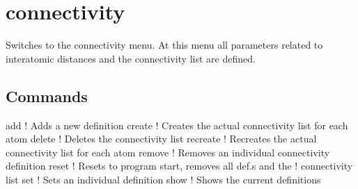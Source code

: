 \section{connectivity}
\par
Switches to the connectivity menu. 
At this menu all parameters related to interatomic distances 
and the connectivity list are defined. 
\par
\subsection*{Commands}
\begin{MacVerbatim}
add     ! Adds a new definition
create  ! Creates the actual connectivity list for each atom
delete  ! Deletes the connectivity list
recreate  ! Recreates the actual connectivity list for each atom
remove  ! Removes an individual connectivity definition
reset   ! Resets to program start, removes all def.s and the
        !        connectivity list
set     ! Sets an individual definition
show    ! Shows the current definitions
\end{MacVerbatim}
